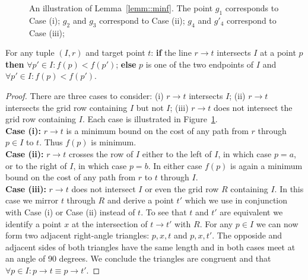 \begin{figure}[tb]
  \begin{center}
    
  \end{center}
  \caption{An illustration of Lemma~\ref{lemm::minf}. The point $g_1$ corresponds 
to Case (i); $g_2$ and $g_3$ correspond to Case (ii); $g_4$ and $g'_4$ correspond
to Case (iii);}
\label{fig::minf}
\end{figure}

\begin{lemm}
\label{lemm::minf}
For any tuple $(I, r)$ and target point $t$: 
\textbf{if} the line $r \rightarrow t$ intersects $I$ at a point
$p$ \textbf{then} $\forall p' \in I: f(p) < f(p')$;
\textbf{else}
$p$ is one of the two endpoints of $I$ and 
$\forall p' \in I: f(p) < f(p')$.
\end{lemm}
\begin{proof}
There are three cases to consider:
(i) $r \rightarrow t$ intersects $I$; (ii) $r \rightarrow t$ intersects
the grid row containing $I$ but not $I$; (iii) $r \rightarrow t$ does 
not intersect the grid row containing $I$. Each
case is illustrated in Figure~\ref{fig::minf}.
\\
\textbf{Case (i):} $r \rightarrow t$ is a minimum bound on the cost of any
path from $r$ through $p \in I$ to $t$. Thus $f(p)$ is minimum.
\\
\textbf{Case (ii):} $r \rightarrow t$ crosses the row of $I$ 
either to the left of $I$, in which
case $p = a$, or to the right of $I$, in which case $p = b$.
In either case $f(p)$ is again a minimum bound on the cost of any
path from $r$ to $t$ through $I$.
\\
\textbf{Case (iii):} $r \rightarrow t$ does not intersect $I$ 
or even the grid row $R$ containing $I$. In this case we mirror
$t$ through $R$ and derive a point $t'$ which we use in
conjunction with Case (i) or Case (ii) instead of $t$.
To see that $t$ and $t'$ are equivalent we identify 
a point $x$ at the intersection of $t \rightarrow t'$ with $R$. 
For any $p \in I$ we can now form two adjacent right-angle
triangles: $p, x, t$ and $p, x, t'$. The opposide and adjacent 
sides of both triangles have the same length and in both cases 
meet at an angle of 90 degrees. We conclude the triangles are
congruent and that 
$\forall p \in I: p \rightarrow t \equiv p \rightarrow t'$.
\end{proof}

